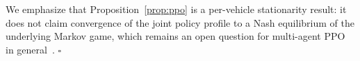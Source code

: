 We emphasize that Proposition~\ref{prop:ppo} is a per-vehicle stationarity result: it does not claim convergence of the joint policy profile to a Nash equilibrium of the underlying Markov game, which remains an open question for multi-agent PPO in general~\cite{dewitt2020independent}. \hfill$\square$
